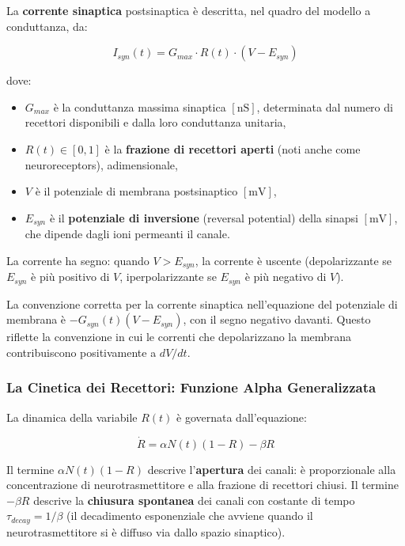 La \textbf{corrente sinaptica} postsinaptica è descritta, nel quadro del modello a conduttanza, da:

\begin{equation}
I_{syn}(t) = G_{max} \cdot R(t) \cdot (V - E_{syn})
\end{equation}

dove:
\begin{itemize}
    \item $G_{max}$ è la conduttanza massima sinaptica $[\text{nS}]$, determinata dal numero di recettori disponibili e dalla loro conduttanza unitaria,
    \item $R(t) \in [0, 1]$ è la \textbf{frazione di recettori aperti} (noti anche come neuroreceptors), adimensionale,
    \item $V$ è il potenziale di membrana postsinaptico $[\text{mV}]$,
    \item $E_{syn}$ è il \textbf{potenziale di inversione} (reversal potential) della sinapsi $[\text{mV}]$, che dipende dagli ioni permeanti il canale.
\end{itemize}

La corrente ha segno: quando $V > E_{syn}$, la corrente è uscente (depolarizzante se $E_{syn}$ è più positivo di $V$, iperpolarizzante se $E_{syn}$ è più negativo di $V$).

\begin{tcolorbox}[colback=gray!5, colframe=gray!40, arc=2mm, boxrule=0.5pt]
La convenzione corretta per la corrente sinaptica nell'equazione del potenziale di membrana è $-G_{syn}(t)(V - E_{syn})$, con il segno negativo davanti. Questo riflette la convenzione in cui le correnti che depolarizzano la membrana contribuiscono positivamente a $dV/dt$.
\end{tcolorbox}

\subsubsection{La Cinetica dei Recettori: Funzione Alpha Generalizzata}

La dinamica della variabile $R(t)$ è governata dall'equazione:

\begin{equation}
\dot{R} = \alpha N(t)(1 - R) - \beta R
\end{equation}


Il termine $\alpha N(t)(1 - R)$ descrive l'\textbf{apertura} dei canali: è proporzionale alla concentrazione di neurotrasmettitore e alla frazione di recettori chiusi. Il termine $-\beta R$ descrive la \textbf{chiusura spontanea} dei canali con costante di tempo $\tau_{decay} = 1/\beta$ (il decadimento esponenziale che avviene quando il neurotrasmettitore si è diffuso via dallo spazio sinaptico).

